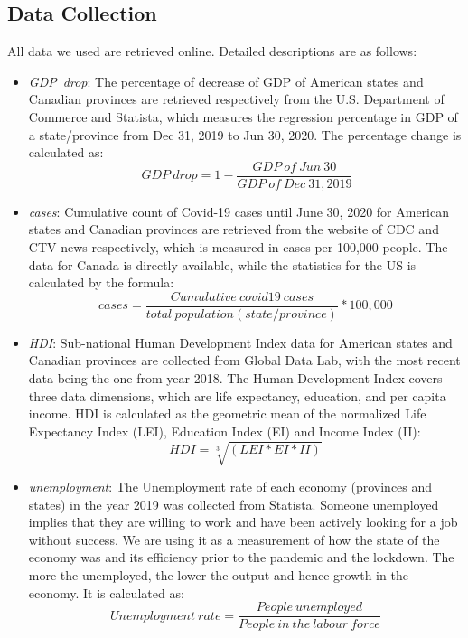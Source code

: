 \documentclass{article}
\begin{document}
\subsection{Data Collection}
\noindent All data we used are retrieved online. Detailed descriptions are as follows:
\begin{itemize}
\item \textit{GDP~drop}: The percentage of decrease of GDP of American states and Canadian provinces are retrieved respectively from the U.S. Department of Commerce and Statista, which measures the regression percentage in GDP of a state/province from Dec 31, 2019 to Jun 30, 2020. The percentage change is calculated as:
$$ ~GDP~drop = 1 - \frac{GDP~ of~ Jun~ 30}{GDP~ of ~Dec~ 31, 2019} $$
\item \textit{cases}: Cumulative count of Covid-19 cases until June 30, 2020 for American states and Canadian provinces are retrieved from the website of CDC and CTV news respectively, which is measured in cases per 100,000 people. The data for Canada is directly available, while the statistics for the US is calculated by the formula:
    $$ cases = \frac{Cumulative ~covid19 ~cases}{total ~population (state/province)} * 100,000 $$ 
\item \textit{HDI}: Sub-national Human Development Index data for American states and Canadian provinces are collected from Global Data Lab, with the most recent data being the one from year 2018. The Human Development Index covers three data dimensions, which are life expectancy, education, and per capita income. HDI is calculated as the geometric mean of the normalized Life Expectancy Index (LEI), Education Index (EI) and Income Index (II):
    $$ HDI = \sqrt[3] {(LEI * EI * II)}$$
\item \textit{unemployment}: The Unemployment rate of each economy (provinces and states) in the year 2019 was collected from Statista. Someone unemployed implies that they are willing to work and have been actively looking for a job without success. We are using it as a measurement of how the state of the economy was and its efficiency prior to the  pandemic and the lockdown. The more the unemployed, the lower the output and hence growth in the economy. It is calculated as:
$$ Unemployment~rate = \frac{People ~unemployed}{People ~in ~the ~labour ~force} $$


\end{itemize}
\end{document}
